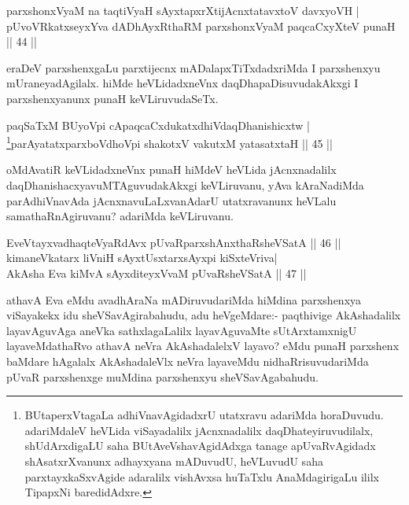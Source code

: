 
\begin{shl}
parxshonxV\s yaM na taqtiVyaH sAyxtapxrXtijAcnxtatavxtoV davxyoVH |\\
pUvoVRkatxseyxYva dADhAyxRthaRM parxshonxV\s yaM paqcaCxyXteV punaH \hfill || 44 ||
\end{shl}

\begin{artha}
eraDeV parxshenxgaLu parxtijecnx mADalapxTiTxdadxriMda I parxshenxyu mUraneyadAgilalx. hiMde heVLidadxneVnx daqDhapaDisuvudakAkxgi I parxshenxyanunx punaH keVLiruvudaSeTx.
\end{artha}


\begin{shl}
paqSaTxM BUyoV\s pi cApaqcaCxdukatxdhiVdaqDhanishicxtw |\\
\footnote{BUtaperxVtagaLa adhiVnavAgidadxrU utatxravu adariMda horaDuvudu. adariMdaleV heVLida viSayadalilx jAcnxnadalilx daqDhateyiruvudilalx, shUdArxdigaLU saha BUtAveVshavAgidAdxga tanage apUvaRvAgidadx shAsatxrXvanunx adhayxyana mADuvudU, heVLuvudU saha parxtayxkaSxvAgide adaralilx vishAvxsa huTaTxlu AnaMdagirigaLu ililx TipapxNi baredidAdxre.}parAyatatxparxboVdhoV\s pi shakotxV vakutxM yatasatxtaH \hfill || 45 ||
\end{shl}

\begin{artha}
oMdAvatiR keVLidadxneVnx punaH hiMdeV heVLida jAcnxnadalilx daqDhanishacxyavuMTAguvudakAkxgi keVLiruvanu, yAva kAraNadiMda parAdhiVnavAda jAcnxnavuLaLxvanAdarU utatxravanunx heVLalu samathaRnAgiruvanu? adariMda keVLiruvanu.
\end{artha}

\begin{shl}
EveVtayxvadhaqteVyaRdAvx pUvaRparxshAnxthaRsheVSatA \hfill || 46 ||\\
kimaneVkatarx liVniH sAyxtUsxtarxsAyxpi kiSxteVriva|\\
AkAsha Eva kiMvA sAyxditeyxVvaM pUvaRsheVSatA \hfill || 47 ||
\end{shl}

\begin{artha}%
athavA Eva eMdu avadhAraNa mADiruvudariMda hiMdina parxshenxya viSayakekx idu sheVSavAgirabahudu, adu heVgeMdare:- paqthivige AkAshadalilx layavAguvAga aneVka sathxlagaLalilx layavAguvaMte sUtArxtamxnigU layaveMdathaRvo athavA neVra AkAshadalelxV layavo? eMdu punaH parxshenx baMdare hAgalalx AkAshadaleVlx neVra layaveMdu nidhaRrisuvudariMda pUvaR parxshenxge muMdina parxshenxyu sheVSavAgabahudu.
\end{artha}


